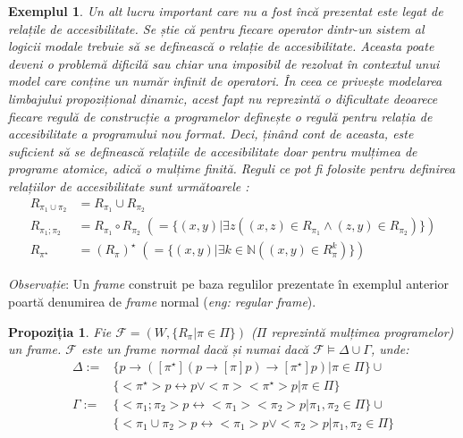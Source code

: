 \documentclass[12pt, openany]{book}
\newtheorem{example}[definition]{Exemplul} %
\newtheorem{sentence}[definition]{Propoziția} %
\newcommand{\myenglishterm}[1]{(\textit{eng: #1})}
\begin{document}
\begin{example}
                Un alt lucru important care nu a fost încă prezentat este legat de relațile de accesibilitate. Se știe 
                că pentru fiecare operator dintr-un sistem al logicii modale trebuie să se definească o relație de 
                accesibilitate. Aceasta poate deveni o problemă dificilă sau chiar una imposibil de rezolvat în 
                contextul unui model care conține un număr infinit de operatori. În ceea ce privește modelarea limbajului 
                propozițional dinamic, acest fapt nu reprezintă o dificultate deoarece fiecare regulă de construcție a 
                programelor definește o regulă pentru relația de accesibilitate a programului nou format. Deci,
                ținând cont de aceasta, este suficient să se definească relațiile de accesibilitate doar pentru mulțimea 
                de programe atomice, adică o mulțime finită. Reguli ce pot fi folosite pentru definirea relațiilor de 
                accesibilitate sunt următoarele \cite{lecture_notes_hedin}:
                \begin{align*}
                    R_{\pi_1 \cup \pi_2} &= R_{\pi_1} \cup R_{\pi_2} \\
                    R_{\pi_1; \pi_2} &= R_{\pi_1} \circ R_{\pi_2} \; (= \{(x,y) | \exists z ((x,z) \in R_{\pi_1} \wedge (z,y) \in R_{\pi_2}) \})\\
                    R_{\pi^\star} &= (R_{\pi})^\star \; (= \{(x,y) | \exists k \in \mathbb{N} ((x,y) \in R_{\pi}^k) \})
                \end{align*}
            \end{example}

            \par{}
                \noindent \textit{Observație}: Un \textit{frame} construit pe baza regulilor prezentate în exemplul 
                anterior poartă denumirea de \textit{frame} normal \myenglishterm{regular frame}. 
                
            \begin{sentence}
                Fie $\mathcal{F}=(W,\{R_\pi | \pi \in \Pi\})$ ($\Pi$ reprezintă mulțimea programelor) un 
                \textit{frame}. $\mathcal{F}$ este un \textit{frame} normal dacă și numai dacă $\mathcal{F} \vDash 
                \Delta \cup \Gamma$, unde:
                \begin{align*}
                    \Delta := &\{p \rightarrow ([\pi^\star](p \rightarrow [\pi]p) \rightarrow [\pi^\star]p) | \pi \in \Pi \} \cup \\
                              & \{<\pi^\star>p \leftrightarrow p \vee <\pi><\pi^\star>p | \pi \in \Pi \} \\
                    \Gamma := &\{<\pi_1; \pi_2> p \leftrightarrow <\pi_1><\pi_2>p | \pi_1,\pi_2 \in \Pi \} \cup \\
                              & \{<\pi_1 \cup \pi_2>p \leftrightarrow <\pi_1>p \vee <\pi_2>p | \pi_1,\pi_2 \in \Pi \}
                \end{align*}
            \end{sentence}
\end{document}
